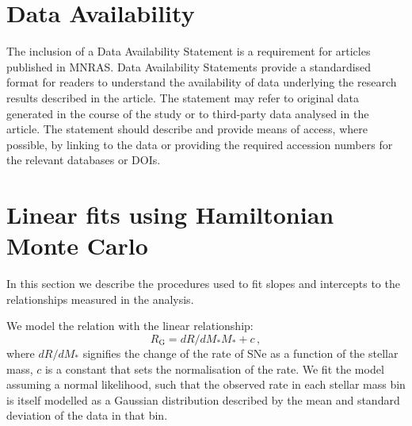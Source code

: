 \documentclass[fleqn,usenatbib]{mnras}
\begin{document}
\section*{Data Availability}

 
The inclusion of a Data Availability Statement is a requirement for articles published in MNRAS. Data Availability Statements provide a standardised format for readers to understand the availability of data underlying the research results described in the article. The statement may refer to original data generated in the course of the study or to third-party data analysed in the article. The statement should describe and provide means of access, where possible, by linking to the data or providing the required accession numbers for the relevant databases or DOIs.












\appendix

\section{Linear fits using Hamiltonian Monte Carlo}
In this section we describe the procedures used to fit slopes and intercepts to the relationships measured in the analysis.

\label{appendix:linear_fits}
We model the relation with the linear relationship: 
\begin{equation}
    R_{\mathrm{G}} = dR/dM_* M_* + c \,,
\label{eq:rate_fit}
\end{equation}
where $dR/dM_*$ signifies the change of the rate of SNe as a function of the stellar mass, $c$ is a constant that sets the normalisation of the rate. We fit the model assuming a normal likelihood, such that the observed rate in each stellar mass bin is itself modelled as a Gaussian distribution described by the mean and standard deviation of the data in that bin.



\bsp	%
\label{lastpage}
\end{document}
